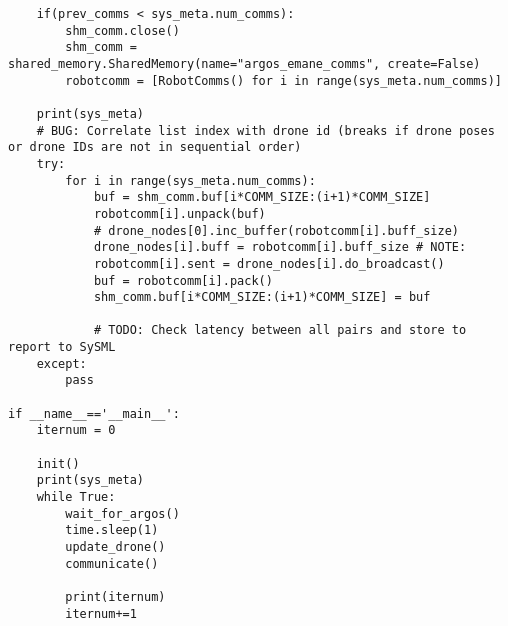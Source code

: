 \begin{verbatim}
    if(prev_comms < sys_meta.num_comms):
        shm_comm.close()
        shm_comm = shared_memory.SharedMemory(name="argos_emane_comms", create=False)
        robotcomm = [RobotComms() for i in range(sys_meta.num_comms)]

    print(sys_meta)
    # BUG: Correlate list index with drone id (breaks if drone poses or drone IDs are not in sequential order)
    try:
        for i in range(sys_meta.num_comms):
            buf = shm_comm.buf[i*COMM_SIZE:(i+1)*COMM_SIZE]
            robotcomm[i].unpack(buf)
            # drone_nodes[0].inc_buffer(robotcomm[i].buff_size)
            drone_nodes[i].buff = robotcomm[i].buff_size # NOTE:
            robotcomm[i].sent = drone_nodes[i].do_broadcast()
            buf = robotcomm[i].pack()
            shm_comm.buf[i*COMM_SIZE:(i+1)*COMM_SIZE] = buf

            # TODO: Check latency between all pairs and store to report to SySML
    except:
        pass

if __name__=='__main__':
    iternum = 0

    init()
    print(sys_meta)
    while True:
        wait_for_argos()
        time.sleep(1)
        update_drone()
        communicate()

        print(iternum)
        iternum+=1
\end{verbatim}

